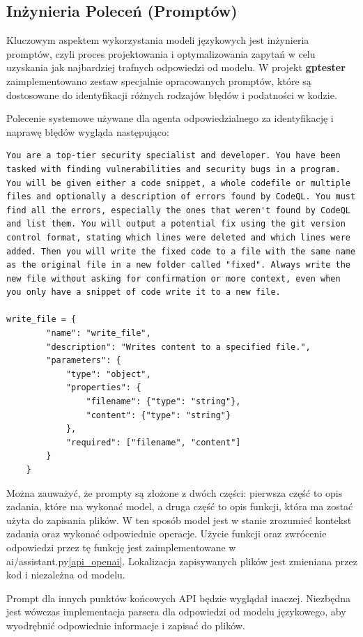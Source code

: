 \subsection{Inżynieria Poleceń (Promptów)}
Kluczowym aspektem wykorzystania modeli językowych jest inżynieria promptów, czyli proces projektowania i optymalizowania zapytań w celu uzyskania jak najbardziej trafnych odpowiedzi od modelu. W projekt \textbf{gptester} zaimplementowano zestaw specjalnie opracowanych promptów, które są dostosowane do identyfikacji różnych rodzajów błędów i podatności w kodzie.

Polecenie systemowe używane dla agenta odpowiedzialnego za identyfikację i naprawę błędów wygląda następująco:
\begin{verbatim}
You are a top-tier security specialist and developer. You have been 
tasked with finding vulnerabilities and security bugs in a program. 
You will be given either a code snippet, a whole codefile or multiple 
files and optionally a description of errors found by CodeQL. You must 
find all the errors, especially the ones that weren't found by CodeQL 
and list them. You will output a potential fix using the git version 
control format, stating which lines were deleted and which lines were 
added. Then you will write the fixed code to a file with the same name 
as the original file in a new folder called "fixed". Always write the 
new file without asking for confirmation or more context, even when 
you only have a snippet of code write it to a new file.

write_file = {
        "name": "write_file",
        "description": "Writes content to a specified file.",
        "parameters": {
            "type": "object",
            "properties": {
                "filename": {"type": "string"},
                "content": {"type": "string"}
            },
            "required": ["filename", "content"]
        }
    }

\end{verbatim}


Można zauważyć, że prompty są złożone z dwóch części: pierwsza część to opis zadania, które ma wykonać model, a druga część to opis funkcji, która ma zostać użyta do zapisania plików. W ten sposób model jest w stanie zrozumieć kontekst zadania oraz wykonać odpowiednie operacje. Użycie funkcji oraz zwrócenie odpowiedzi przez tę funkcję jest zaimplementowane w ai/assistant.py\ref{api_openai}. Lokalizacja zapisywanych plików jest zmieniana przez kod i niezależna od modelu.

Prompt dla innych punktów końcowych API będzie wyglądał inaczej. Niezbędna jest wówczas implementacja parsera dla odpowiedzi od modelu językowego, aby wyodrębnić odpowiednie informacje i zapisać do plików.

